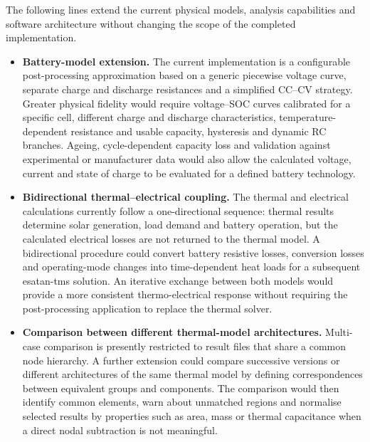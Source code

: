 The following lines extend the current physical models, analysis capabilities
and software architecture without changing the scope of the completed
implementation.

\begin{itemize}[
    leftmargin=*,
    itemsep=0.9em,
    topsep=0.5em,
    parsep=0pt
]
    \item \textbf{Battery-model extension.}
    The current implementation is a configurable post-processing approximation
    based on a generic piecewise voltage curve, separate charge and discharge
    resistances and a simplified CC--CV strategy. Greater physical fidelity
    would require voltage--SOC curves calibrated for a specific cell, different
    charge and discharge characteristics, temperature-dependent resistance and
    usable capacity, hysteresis and dynamic RC branches. Ageing,
    cycle-dependent capacity loss and validation against experimental or
    manufacturer data would also allow the calculated voltage, current and
    state of charge to be evaluated for a defined battery technology.

    \item \textbf{Bidirectional thermal--electrical coupling.}
    The thermal and electrical calculations currently follow a one-directional
    sequence: thermal results determine solar generation, load demand and
    battery operation, but the calculated electrical losses are not returned
    to the thermal model. A bidirectional procedure could convert battery
    resistive losses, conversion losses and operating-mode changes into
    time-dependent heat loads for a subsequent \acrshort{esatan-tms} solution.
    An iterative exchange between both models would provide a more consistent
    thermo-electrical response without requiring the post-processing
    application to replace the thermal solver.

    \item \textbf{Comparison between different thermal-model architectures.}
    Multi-case comparison is presently restricted to result files that share a
    common node hierarchy. A further extension could compare successive
    versions or different architectures of the same thermal model by defining
    correspondences between equivalent groups and components. The comparison
    would then identify common elements, warn about unmatched regions and
    normalise selected results by properties such as area, mass or thermal
    capacitance when a direct nodal subtraction is not meaningful.


\end{itemize}
